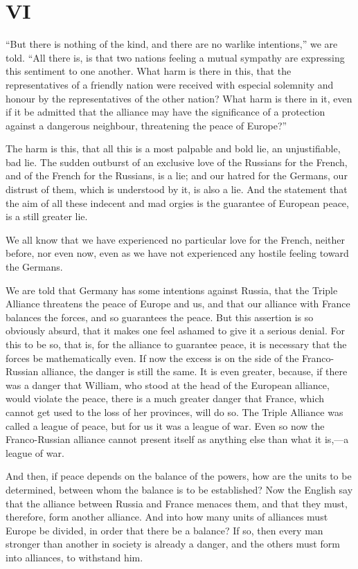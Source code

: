 \documentclass{book}
\begin{document}
\chapter{VI}
\label{chapter-6}
“But there is nothing of the kind, and there are no warlike intentions,” we are told. “All there is, is that two nations feeling a mutual sympathy are expressing this sentiment to one another. What harm is there in this, that the representatives of a friendly nation were received with especial solemnity and honour by the representatives of the other nation? What harm is there in it, even if it be admitted that the alliance may have the significance of a protection against a dangerous neighbour, threatening the peace of Europe?”

The harm is this, that all this is a most palpable and bold lie, an unjustifiable, bad lie. The sudden outburst of an exclusive love of the Russians for the French, and of the French for the Russians, is a lie; and our hatred for the Germans, our distrust of them, which is understood by it, is also a lie. And the statement that the aim of all these indecent and mad orgies is the guarantee of European peace, is a still greater lie.

We all know that we have experienced no particular love for the French, neither before, nor even now, even as we have not experienced any hostile feeling toward the Germans.

We are told that Germany has some intentions against Russia, that the Triple Alliance threatens the peace of Europe and us, and that our alliance with France balances the forces, and so guarantees the peace. But this assertion is so obviously absurd, that it makes one feel ashamed to give it a serious denial. For this to be so, that is, for the alliance to guarantee peace, it is necessary that the forces be mathematically even. If now the excess is on the side of the Franco-Russian alliance, the danger is still the same. It is even greater, because, if there was a danger that William, who stood at the head of the European alliance, would violate the peace, there is a much greater danger that France, which cannot get used to the loss of her provinces, will do so. The Triple Alliance was called a league of peace, but for us it was a league of war. Even so now the Franco-Russian alliance cannot present itself as anything else than what it is,—a league of war.

And then, if peace depends on the balance of the powers, how are the units to be determined, between whom the balance is to be established? Now the English say that the alliance between Russia and France menaces them, and that they must, therefore, form another alliance. And into how many units of alliances must Europe be divided, in order that there be a balance? If so, then every man stronger than another in society is already a danger, and the others must form into alliances, to withstand him.
\end{document}
